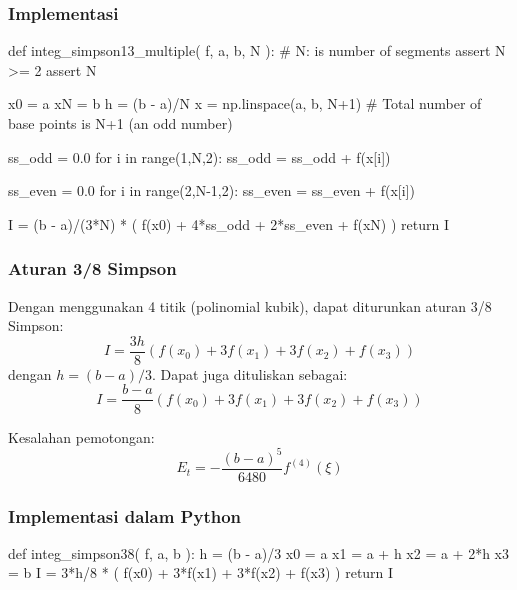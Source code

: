 \begin{frame}[fragile]
\frametitle{Implementasi}

\begin{pythoncode}
def integ_simpson13_multiple( f, a, b, N ):
    # N: is number of segments
    assert N >= 2
    assert N %
    
    x0 = a
    xN = b
    h = (b - a)/N
    x = np.linspace(a, b, N+1)
    # Total number of base points is N+1 (an odd number)
    
    ss_odd = 0.0
    for i in range(1,N,2):
        ss_odd = ss_odd + f(x[i])
        
    ss_even = 0.0
    for i in range(2,N-1,2):
        ss_even = ss_even + f(x[i])
    
    I = (b - a)/(3*N) * ( f(x0) + 4*ss_odd + 2*ss_even + f(xN) )
    return I
\end{pythoncode}

\end{frame}




\begin{frame}
\frametitle{Aturan 3/8 Simpson}

Dengan menggunakan 4 titik (polinomial kubik), dapat diturunkan aturan 3/8 Simpson:
\begin{equation*}
I = \frac{3h}{8} ( f(x_0) + 3f(x_1) + 3f(x_2) + f(x_3) )
\end{equation*}
dengan $h = (b-a)/3$.
Dapat juga dituliskan sebagai:
\begin{equation*}
I = \frac{b-a}{8} ( f(x_0) + 3f(x_1) + 3f(x_2) + f(x_3) )
\end{equation*}

Kesalahan pemotongan:
\begin{equation*}
E_{t} = -\frac{(b-a)^5}{6480} f^{(4)}(\xi)
\end{equation*}

\end{frame}



\begin{frame}[fragile]
\frametitle{Implementasi dalam Python}

\begin{pythoncode}
def integ_simpson38( f, a, b ):
    h = (b - a)/3
    x0 = a
    x1 = a + h
    x2 = a + 2*h
    x3 = b
    I = 3*h/8 * ( f(x0) + 3*f(x1) + 3*f(x2) + f(x3) )
    return I
\end{pythoncode}

\end{frame}


